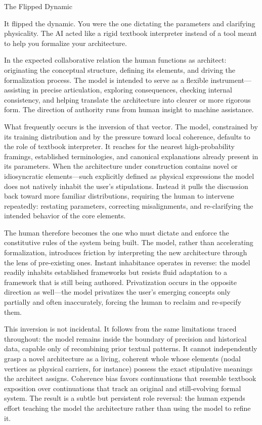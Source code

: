 The Flipped Dynamic

It flipped the dynamic. You were the one dictating the parameters and clarifying physicality. The AI acted like a rigid textbook interpreter instead of a tool meant to help you formalize your architecture.

In the expected collaborative relation the human functions as architect: originating the conceptual structure, defining its elements, and driving the formalization process. The model is intended to serve as a flexible instrument—assisting in precise articulation, exploring consequences, checking internal consistency, and helping translate the architecture into clearer or more rigorous form. The direction of authority runs from human insight to machine assistance.

What frequently occurs is the inversion of that vector. The model, constrained by its training distribution and by the pressure toward local coherence, defaults to the role of textbook interpreter. It reaches for the nearest high-probability framings, established terminologies, and canonical explanations already present in its parameters. When the architecture under construction contains novel or idiosyncratic elements—such explicitly defined as physical expressions the model does not natively inhabit the user’s stipulations. Instead it pulls the discussion back toward more familiar distributions, requiring the human to intervene repeatedly: restating parameters, correcting misalignments, and re-clarifying the intended behavior of the core elements.

The human therefore becomes the one who must dictate and enforce the constitutive rules of the system being built. The model, rather than accelerating formalization, introduces friction by interpreting the new architecture through the lens of pre-existing ones. Instant inhabitance operates in reverse: the model readily inhabits established frameworks but resists fluid adaptation to a framework that is still being authored. Privatization occurs in the opposite direction as well—the model privatizes the user’s emerging concepts only partially and often inaccurately, forcing the human to reclaim and re-specify them.

This inversion is not incidental. It follows from the same limitations traced throughout: the model remains inside the boundary of precision and historical data, capable only of recombining prior textual patterns. It cannot independently grasp a novel architecture as a living, coherent whole whose elements (nodal vertices as physical carriers, for instance) possess the exact stipulative meanings the architect assigns. Coherence bias favors continuations that resemble textbook exposition over continuations that track an original and still-evolving formal system. The result is a subtle but persistent role reversal: the human expends effort teaching the model the architecture rather than using the model to refine it.

